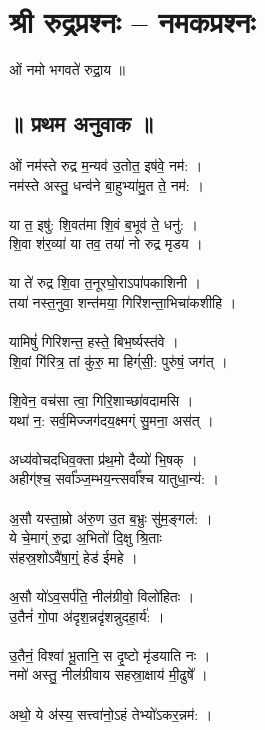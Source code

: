 \section{श्री रुद्रप्रश्नः – नमकप्रश्नः}
ओं नमो भगवते॑ रुद्रा॒य ॥\\
\subsection{॥ प्रथम अनुवाक ॥}
ओं नम॑स्ते रुद्र म॒न्यव॑ उ॒तोत॒ इष॑वे॒ नम॑: ।\\
नम॑स्ते अस्तु॒ धन्व॑ने बा॒हुभ्या॑मु॒त ते॒ नम॑: ।\\
\\
या त॒ इषु॑: शि॒वत॑मा शि॒वं ब॒भूव॑ ते॒ धनु॑: ।\\
शि॒वा श॑र॒व्या॑ या तव॒ तया॑ नो रुद्र मृडय ।\\
\\
या ते॑ रुद्र शि॒वा त॒नूरघो॒राऽपा॑पकाशिनी ।\\
तया॑ नस्त॒नुवा॒ शन्त॑मया॒ गिरि॑शन्ता॒भिचा॑कशीहि ।\\
\\
यामिषुं॑ गिरिशन्त॒ हस्ते॒ बिभ॒र्ष्यस्त॑वे ।\\
शि॒वां गि॑रित्र॒ तां कु॑रु॒ मा हिग्ं॑सी॒: पुरु॑षं॒ जग॑त् ।\\
\\
शि॒वेन॒ वच॑सा त्वा॒ गिरि॒शाच्छा॑वदामसि ।\\
यथा॑ न॒: सर्व॒मिज्जग॑दय॒क्ष्मग्ं सु॒मना॒ अस॑त् ।\\
\\
अध्य॑वोचदधिव॒क्ता प्र॑थ॒मो दैव्यो॑ भि॒षक् ।\\
अहीग्॑श्च॒ सर्वा᳚ञ्ज॒म्भय॒न्त्सर्वा᳚श्च यातुधा॒न्य॑: ।\\
\\
अ॒सौ यस्ता॒म्रो अ॑रु॒ण उ॒त ब॒भ्रुः सु॑म॒ङ्गल॑: ।\\
ये चे॒माग्ं रु॒द्रा अ॒भितो॑ दि॒क्षु श्रि॒ताः\\
स॑हस्र॒शोऽवै॑षा॒ग्ं॒ हेड॑ ईमहे ।\\
\\
अ॒सौ यो॑ऽव॒सर्प॑ति॒ नील॑ग्रीवो॒ विलो॑हितः ।\\
उ॒तैनं॑ गो॒पा अ॑दृश॒न्नदृ॑शन्नुदहा॒र्य॑: ।\\
\\
उ॒तैनं॒ विश्वा॑ भू॒तानि॒ स दृ॒ष्टो मृ॑डयाति नः ।\\
नमो॑ अस्तु॒ नील॑ग्रीवाय सहस्रा॒क्षाय॑ मी॒ढुषे᳚ ।\\
\\
अथो॒ ये अ॑स्य॒ सत्त्वा॑नो॒ऽहं तेभ्यो॑ऽकर॒न्नम॑: ।\\
